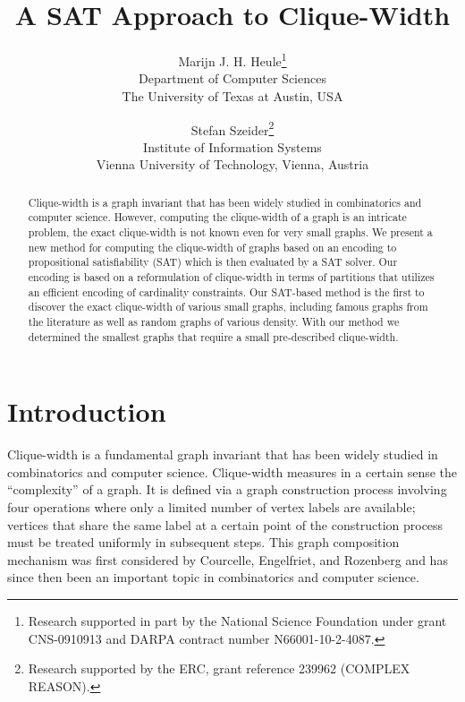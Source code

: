 \documentclass[10pt,usletter]{article}
\date{}
\theoremstyle{remark}
\begin{document}
\title{A SAT Approach to Clique-Width}
\author{Marijn J. H. Heule\thanks{Research supported in part by the National Science
   Foundation under grant CNS-0910913 and DARPA
    contract number N66001-10-2-4087.}\\
\small  Department of Computer Sciences\\[-3pt]
\small  The University of Texas at Austin, USA
  \and Stefan Szeider\thanks{Research supported by the ERC, grant
    reference 239962 (COMPLEX REASON).}\\
\small  Institute of Information Systems\\[-3pt]
\small  Vienna University of Technology,
  Vienna, Austria 
}



\maketitle

\thispagestyle{empty}

\begin{abstract}
  Clique-width is a graph invariant that has been widely studied in
  combinatorics and computer science.  However, computing the
  clique-width of a graph is an intricate problem, the exact
  clique-width is not known even for very small graphs.  We present a
  new method for computing the clique-width of graphs based on an
  encoding to propositional satisfiability (SAT) which is then
  evaluated by a SAT solver. Our encoding is based on a reformulation
  of clique-width in terms of partitions that utilizes an efficient
  encoding of cardinality constraints.  Our SAT-based method is the
  first to discover the exact clique-width of various small graphs,
  including famous graphs from the literature as well as random graphs
  of various density. With our method we determined the smallest graphs
  that require a small pre-described clique-width.
\end{abstract}

\section{Introduction}\label{sect:intro}


Clique-width is a fundamental graph invariant that has been widely
studied in combinatorics and computer science. Clique-width measures
in a certain sense the ``complexity'' of a graph. It is defined via a
graph construction process involving four operations where only a
limited number of vertex labels are available; vertices that share the
same label at a certain point of the construction process must be
treated uniformly in subsequent steps.  This graph composition
mechanism was first considered by Courcelle, Engelfriet, and Rozenberg
\cite{CourcelleEngelfrietRozenberg90,CourcelleEngelfrietRozenberg93}
and has since then been an important topic in combinatorics and
computer science.
\end{document}
